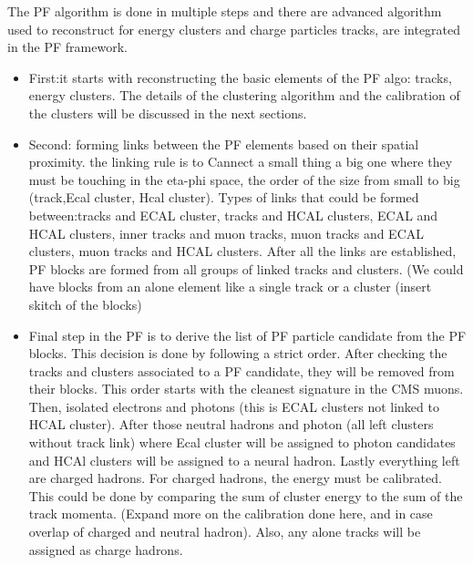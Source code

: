 The PF algorithm is done in multiple steps and there are advanced algorithm used to reconstruct for energy clusters and charge particles tracks,
are integrated in the PF framework. 
\begin{itemize}
\item First:it starts with reconstructing the basic elements of the PF algo: tracks, energy clusters. The details of the clustering algorithm and the calibration of the clusters will be discussed in the next sections.
  
 \item Second: forming links between the PF elements based on their spatial proximity. the linking rule is to Cannect a small thing a big one where they must be touching in the eta-phi space, the order of the size from small to big (track,Ecal cluster, Hcal cluster).
   Types of links that could be formed between:tracks and ECAL cluster, tracks and HCAL clusters, ECAL and HCAL clusters, inner tracks and muon tracks,
   muon tracks and ECAL clusters, muon tracks and HCAL clusters.
   After all the links are established, PF blocks are formed from all groups of linked tracks and clusters.
   (We could have blocks from an alone element like a single track or a cluster (insert skitch of the blocks)
   
 \item Final step in the PF is to derive the list of PF particle candidate from the PF blocks. This decision is done by following a strict order.
   After checking the tracks and clusters associated to a PF candidate, they will be removed from their blocks.
   This order starts with the cleanest signature in the CMS muons.
   Then, isolated electrons and photons (this is ECAL clusters not linked to HCAL cluster).
   After those neutral hadrons and photon (all left clusters without track link) where Ecal cluster will be assigned to photon candidates and HCAl clusters will be assigned to a neural hadron.
   Lastly everything left are charged hadrons. For charged hadrons, the energy must be calibrated. This could be done by comparing the sum of cluster energy to the sum of the track momenta. (Expand more on the calibration done here, and in case overlap of charged and neutral hadron). Also, any alone tracks will be assigned as charge hadrons. 

\end{itemize}

